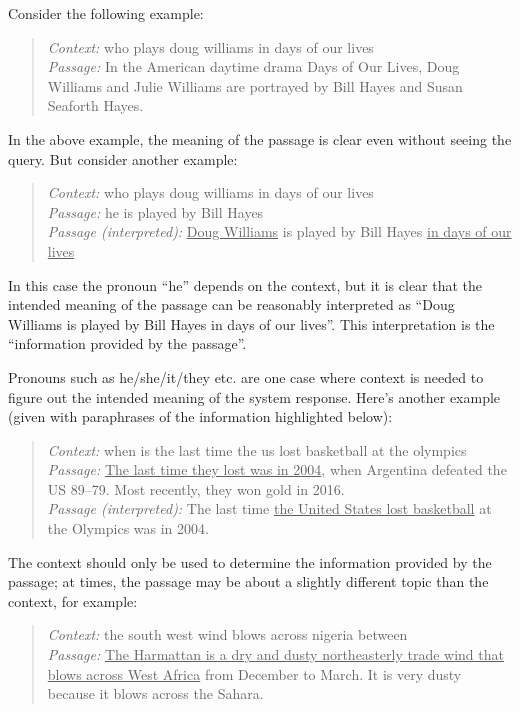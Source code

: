\documentclass[11pt]{article}
\begin{document}
Consider the following example:

\begin{quote}
\textit{Context:} who plays doug williams in days of our lives \\
\textit{Passage:} In the American daytime drama Days of Our Lives, Doug Williams and Julie Williams are portrayed by Bill Hayes and Susan Seaforth Hayes. \\
\end{quote}

In the above example, the meaning of the passage is clear even without seeing the query. But consider another example:

\begin{quote}
\textit{Context:} who plays doug williams in days of our lives \\
\textit{Passage:} he is played by Bill Hayes \\
\textit{Passage (interpreted):} \ul{Doug Williams} is played by Bill Hayes \ul{in days of our lives}
\end{quote}

In this case the pronoun ``he'' depends on the context, but it is clear that the  intended meaning of the passage can be reasonably interpreted as ``Doug Williams is played by Bill Hayes in days of our lives''. This interpretation is the ``information provided by the passage''. 

Pronouns such as he/she/it/they etc. are one case where context is needed to figure out the intended meaning of the system response. Here's another example (given with paraphrases of the information highlighted below):

\begin{quote}
\textit{Context:} when is the last time the us lost basketball at the olympics \\
\textit{Passage:} \ul{The last time they lost was in 2004}, when Argentina defeated the US 89–79. Most recently, they won gold in 2016. \\
\textit{Passage (interpreted):} The last time \ul{the United States lost basketball} at the Olympics was in 2004.
\end{quote}

The context should only be used to determine the information provided by the passage; at times, the passage may be about a slightly different topic than the context, for example:

\begin{quote}
\textit{Context:} the south west wind blows across nigeria between \\
\textit{Passage:} \ul{The Harmattan is a dry and dusty northeasterly trade wind that blows across West Africa} from December to March. It is very dusty because it blows across the Sahara.
\end{quote}
\end{document}
